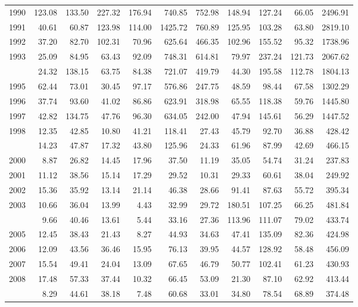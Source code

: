 \begin{longtable}[t]{rrrrrrrrrrr}
1990 & 123.08 & 133.50 & 227.32 & 176.94 & 740.85 & 752.98 & 148.94 & 127.24 & 66.05 & 2496.91\\
1991 & 40.61 & 60.87 & 123.98 & 114.00 & 1425.72 & 760.89 & 125.95 & 103.28 & 63.80 & 2819.10\\
1992 & 37.20 & 82.70 & 102.31 & 70.96 & 625.64 & 466.35 & 102.96 & 155.52 & 95.32 & 1738.96\\
1993 & 25.09 & 84.95 & 63.43 & 92.09 & 748.31 & 614.81 & 79.97 & 237.24 & 121.73 & 2067.62\\
\addlinespace
1994 & 24.32 & 138.15 & 63.75 & 84.38 & 721.07 & 419.79 & 44.30 & 195.58 & 112.78 & 1804.13\\
1995 & 62.44 & 73.01 & 30.45 & 97.17 & 576.86 & 247.75 & 48.59 & 98.44 & 67.58 & 1302.29\\
1996 & 37.74 & 93.60 & 41.02 & 86.86 & 623.91 & 318.98 & 65.55 & 118.38 & 59.76 & 1445.80\\
1997 & 42.82 & 134.75 & 47.76 & 96.30 & 634.05 & 242.00 & 47.94 & 145.61 & 56.29 & 1447.52\\
1998 & 12.35 & 42.85 & 10.80 & 41.21 & 118.41 & 27.43 & 45.79 & 92.70 & 36.88 & 428.42\\
\addlinespace
1999 & 14.23 & 47.87 & 17.32 & 43.80 & 125.96 & 24.33 & 61.96 & 87.99 & 42.69 & 466.15\\
2000 & 8.87 & 26.82 & 14.45 & 17.96 & 37.50 & 11.19 & 35.05 & 54.74 & 31.24 & 237.83\\
2001 & 11.12 & 38.56 & 15.14 & 17.29 & 29.52 & 10.31 & 29.33 & 60.61 & 38.04 & 249.92\\
2002 & 15.36 & 35.92 & 13.14 & 21.14 & 46.38 & 28.66 & 91.41 & 87.63 & 55.72 & 395.34\\
2003 & 10.66 & 36.04 & 13.99 & 4.43 & 32.99 & 29.72 & 180.51 & 107.25 & 66.25 & 481.84\\
\addlinespace
2004 & 9.66 & 40.46 & 13.61 & 5.44 & 33.16 & 27.36 & 113.96 & 111.07 & 79.02 & 433.74\\
2005 & 12.45 & 38.43 & 21.43 & 8.27 & 44.93 & 34.63 & 47.41 & 135.09 & 82.36 & 424.98\\
2006 & 12.09 & 43.56 & 36.46 & 15.95 & 76.13 & 39.95 & 44.57 & 128.92 & 58.48 & 456.09\\
2007 & 15.54 & 49.41 & 24.04 & 13.09 & 67.65 & 46.79 & 50.77 & 102.41 & 61.23 & 430.93\\
2008 & 17.48 & 57.33 & 37.44 & 10.32 & 66.45 & 53.09 & 21.30 & 87.10 & 62.92 & 413.44\\
\addlinespace
2009 & 8.29 & 44.61 & 38.18 & 7.48 & 60.68 & 33.01 & 34.80 & 78.54 & 68.89 & 374.48\\

\end{longtable}
